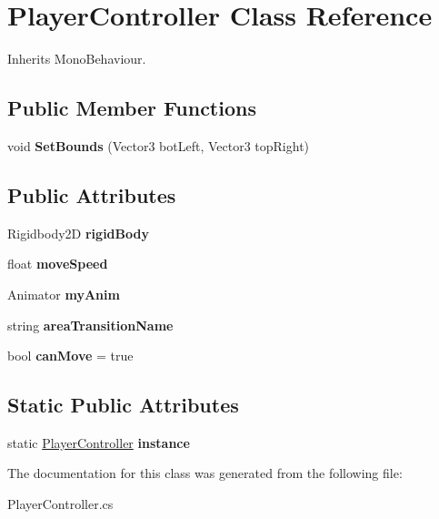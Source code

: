 \hypertarget{class_player_controller}{}\section{Player\+Controller Class Reference}
\label{class_player_controller}


Inherits Mono\+Behaviour.

\subsection*{Public Member Functions}
\begin{DoxyCompactItemize}
\item 
\mbox{\label{class_player_controller_a6bb7d101db8f8020111319aafa26d7df}} 
void {\bfseries Set\+Bounds} (Vector3 bot\+Left, Vector3 top\+Right)
\end{DoxyCompactItemize}
\subsection*{Public Attributes}
\begin{DoxyCompactItemize}
\item 
\mbox{\label{class_player_controller_a9721b8d04bb06ef1f2d9f5a3b56c0353}} 
Rigidbody2D {\bfseries rigid\+Body}
\item 
\mbox{\label{class_player_controller_abb12e85ca1b12efdbc8684bff2e19c4c}} 
float {\bfseries move\+Speed}
\item 
\mbox{\label{class_player_controller_a95091757098a5cc3f29273d44870c5ce}} 
Animator {\bfseries my\+Anim}
\item 
\mbox{\label{class_player_controller_a5192f7633b3aea3e61a0a29e13df8feb}} 
string {\bfseries area\+Transition\+Name}
\item 
\mbox{\label{class_player_controller_a14bb057d727180f87728bd6fe62dffc9}} 
bool {\bfseries can\+Move} = true
\end{DoxyCompactItemize}
\subsection*{Static Public Attributes}
\begin{DoxyCompactItemize}
\item 
\mbox{\label{class_player_controller_a7c7537f54160d265fd8bfea33e43631c}} 
static \mbox{\hyperlink{class_player_controller}{Player\+Controller}} {\bfseries instance}
\end{DoxyCompactItemize}


The documentation for this class was generated from the following file\+:\begin{DoxyCompactItemize}
\item 
Player\+Controller.\+cs\end{DoxyCompactItemize}
